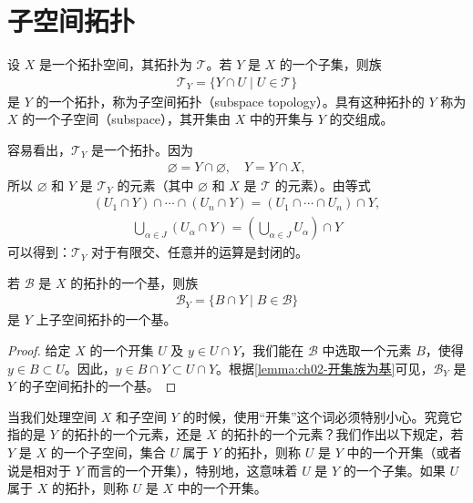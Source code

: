 \documentclass[../../main.tex]{subfiles}
\begin{document}
\section{子空间拓扑}\label{section:ch02-子空间拓扑}

\begin{definition}[子空间拓扑]\label{definition:ch02-子空间拓扑}
设 $X$ 是一个拓扑空间，其拓扑为 $\mathcal{T}$。若 $Y$ 是 $X$ 的一个子集，则族
\begin{align*}
\mathcal{T}_{Y} = \{Y \cap U \mid U \in \mathcal{T}\}
\end{align*}
是 $Y$ 的一个拓扑，称为子空间拓扑（subspace topology）。具有这种拓扑的 $Y$ 称为 $X$ 的一个子空间（subspace），其开集由 $X$ 中的开集与 $Y$ 的交组成。
\end{definition}

容易看出，$\mathcal{T}_{Y}$ 是一个拓扑。因为
\begin{align*}
\varnothing = Y \cap \varnothing, \quad Y = Y \cap X,
\end{align*}
所以 $\varnothing$ 和 $Y$ 是 $\mathcal{T}_{Y}$ 的元素（其中 $\varnothing$ 和 $X$ 是 $\mathcal{T}$ 的元素）。由等式
\begin{align*}
(U_{1} \cap Y) \cap \cdots \cap (U_{n} \cap Y) = (U_{1} \cap \cdots \cap U_{n}) \cap Y,
\end{align*}
\begin{align*}
\bigcup_{\alpha \in J} (U_{\alpha} \cap Y) = (\bigcup_{\alpha \in J} U_{\alpha}) \cap Y
\end{align*}
可以得到：$\mathcal{T}_{Y}$ 对于有限交、任意并的运算是封闭的。

\begin{lemma}[子空间拓扑的基]\label{lemma:ch02-子空间基}
若 $\mathcal{B}$ 是 $X$ 的拓扑的一个基，则族
\begin{align*}
\mathcal{B}_{Y} = \{B \cap Y \mid B \in \mathcal{B}\}
\end{align*}
是 $Y$ 上子空间拓扑的一个基。
\end{lemma}

\begin{proof}
给定 $X$ 的一个开集 $U$ 及 $y \in U \cap Y$，我们能在 $\mathcal{B}$ 中选取一个元素 $B$，使得 $y \in B \subset U$。因此，$y \in B \cap Y \subset U \cap Y$。根据\cref{lemma:ch02-开集族为基}可见，$\mathcal{B}_{Y}$ 是 $Y$ 的子空间拓扑的一个基。
\end{proof}

当我们处理空间 $X$ 和子空间 $Y$ 的时候，使用“开集”这个词必须特别小心。究竟它指的是 $Y$ 的拓扑的一个元素，还是 $X$ 的拓扑的一个元素？我们作出以下规定，若 $Y$ 是 $X$ 的一个子空间，集合 $U$ 属于 $Y$ 的拓扑，则称 $U$ 是 $Y$ 中的一个开集（或者说是相对于 $Y$ 而言的一个开集），特别地，这意味着 $U$ 是 $Y$ 的一个子集。如果 $U$ 属于 $X$ 的拓扑，则称 $U$ 是 $X$ 中的一个开集。
\end{document}
